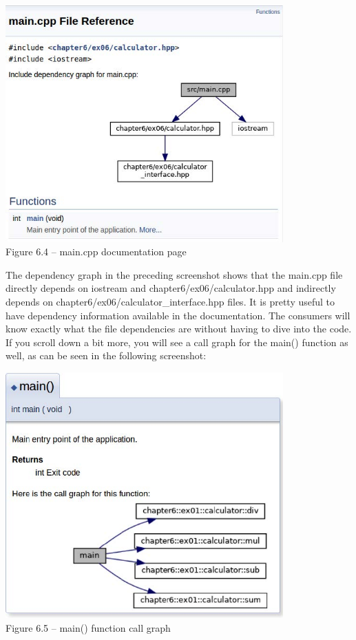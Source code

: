 \begin{center}
\includegraphics[width=0.8\textwidth]{content/2/chapter6/images/4.jpg}\\
Figure 6.4 – main.cpp documentation page
\end{center}

The dependency graph in the preceding screenshot shows that the main.cpp file directly depends on iostream and chapter6/ex06/calculator.hpp and indirectly depends on chapter6/ex06/calculator\_interface.hpp files. It is pretty useful to have dependency information available in the documentation. The consumers will know exactly what the file dependencies are without having to dive into the code. If you scroll down a bit more, you will see a call graph for the main() function as well, as can be seen in the following screenshot:

\begin{center}
\includegraphics[width=0.8\textwidth]{content/2/chapter6/images/5.jpg}\\
Figure 6.5 – main() function call graph
\end{center}

